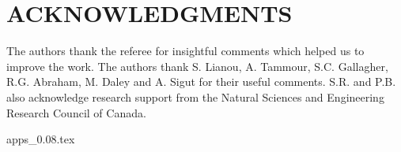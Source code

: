 \documentclass[useAMS,usenatbib]{mn2e}
\begin{document}
\section*{ACKNOWLEDGMENTS}
The authors thank the referee for insightful comments which helped us to improve the work.
The authors thank S. Lianou, A. Tammour, S.C. Gallagher, R.G. Abraham, M. Daley and A. Sigut for their useful comments. 
S.R. and P.B. also acknowledge research support from the Natural Sciences and Engineering Research Council of Canada. 



{apps_0.08.tex}
\end{document}
